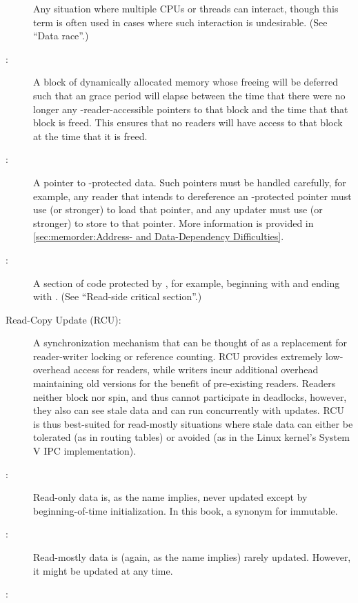 \begin{description}
	Any situation where multiple CPUs or threads can interact,
	though this term is often used in cases where such interaction
	is undesirable.
	(See ``Data race''.)
\item[\IXGaltr{RCU-Protected Data}{RCU-protected data}:]
	A block of dynamically allocated memory whose freeing will be
	deferred such that an  grace period will elapse between the
	time that there were no longer any -reader-accessible pointers
	to that block and the time that that block is freed.
	This ensures that no  readers will have access to that block at
	the time that it is freed.
\item[\IXGaltr{RCU-Protected Pointer}{RCU-protected pointer}:]
	A pointer to -protected data.
	Such pointers must be handled carefully, for example, any reader
	that intends to dereference an -protected pointer must
	use  (or stronger) to load that pointer,
	and any updater must use  (or stronger)
	to store to that pointer.
	More information is provided in
	\cref{sec:memorder:Address- and Data-Dependency Difficulties}.
\item[\IXGalthmr{RCU Read-Side Critical Section}{RCU read-side}{critical section}:]
	A section of code protected by , for example, beginning with
	 and ending with .
	(See ``Read-side critical section''.)
\item[Read-Copy Update (RCU):]
	A synchronization mechanism that can be thought of as a replacement
	for reader-writer locking or reference counting.
	RCU provides extremely low-overhead access for readers, while
	writers incur additional overhead maintaining old versions
	for the benefit of pre-existing readers.
	Readers neither block nor spin, and thus cannot participate in
	deadlocks, however, they also can see stale data and can
	run concurrently with updates.
	RCU is thus best-suited for read-mostly situations where
	stale data can either be tolerated (as in routing tables)
	or avoided (as in the Linux kernel's System V IPC implementation).
\item[\IXG{Read Only}:]
	Read-only data is, as the name implies, never updated except
	by beginning-of-time initialization.
	In this book, a synonym for immutable.
\item[\IXG{Read Mostly}:]
	Read-mostly data is (again, as the name implies) rarely updated.
	However, it might be updated at any time.
\item[\IXGh{Read-Side}{Critical Section}:]

\end{description}
